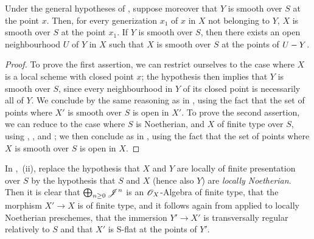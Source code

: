 \begin{corollary}[19.4.9]
\label{IV.19.4.9}
Under the general hypotheses of , suppose moreover that $Y$ is smooth over $S$ at the point $x$.
Then, for every generization $x_1$ of $x$ in $X$ not belonging to $Y$, $X$ is smooth over $S$ at the point $x_1$.
If $Y$ is smooth over $S$, then there exists an open neighbourhood $U$ of $Y$ in $X$ such that $X$ is smooth over $S$ at the points of $U- Y$.
\end{corollary}

\begin{proof}
To prove the first assertion, we can restrict ourselves to the case where $X$ is a local scheme with closed point $x$; the hypothesis then implies that $Y$ is smooth over $S$, since every neighbourhood in $Y$ of its closed point is necessarily all of $Y$. We conclude by the same reasoning as in , using the fact that the set of points where $X'$ is smooth over $S$ is open in $X'$.
To prove the second assertion, we can reduce to the case where $S$ is Noetherian, and $X$ of finite type over $S$, using , ,  and ; we then conclude as in , using the fact that the set of points where $X$ is smooth over $S$ is open in $X$.
\end{proof}

\begin{remark}[19.4.10]
\label{IV.19.4.10}
In ,~(ii), replace the hypothesis that $X$ and $Y$ are locally of finite presentation over $S$ by the hypothesis that $S$ and $X$ (hence also $Y$) are \emph{locally Noetherian}.
Then it is clear that $\bigoplus_{n\geq 0}\mathscr{J}^n$ is an $\mathscr{O}_X$-Algebra of finite type, that the morphism $X'\to X$ is of finite type, and it follows again from  applied to locally Noetherian preschemes, that the immersion $Y'\to X'$ is transversally regular relatively to $S$ and that $X'$ is S-flat at the points of $Y'$.
\end{remark}

